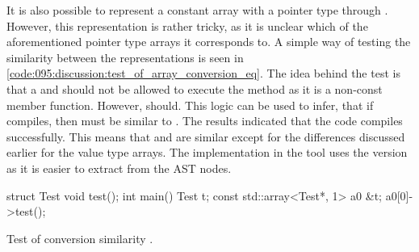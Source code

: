 It is also possible to represent a constant array with a pointer type through .
However, this representation is rather tricky, as it is unclear which of the aforementioned pointer type arrays it corresponds to.
A simple way of testing the similarity between the representations is seen in \cref{code:095:discussion:test_of_array_conversion_eq}.
The idea behind the test is that a  and  should not be allowed to execute the  method as it is a non-const member function. However,  should.
This logic can be used to infer, that if  compiles, then  must be similar to .
The results indicated that the code compiles successfully.
This means that  and  are similar except for the differences discussed earlier for the value type arrays. The implementation in the tool uses the  version as it is easier to extract from the AST nodes.


\begin{listing}[H]
    \begin{cppcode}
struct Test {void test(){}};
int main() {
    Test t;
    const std::array<Test*, 1> a0 {&t};
    a0[0]->test();
}
    \end{cppcode}
    \caption{Test of conversion similarity
    .}
    \label{code:095:discussion:test_of_array_conversion_eq}
\end{listing}


